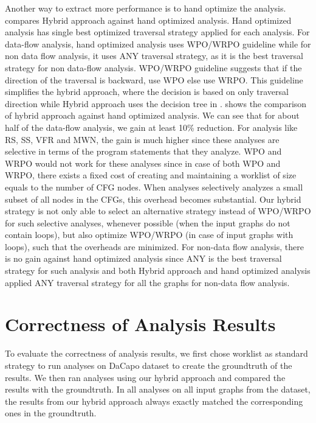 Another way to extract more performance is to hand optimize the analysis.
 compares Hybrid approach against hand optimized analysis. Hand optimized analysis has single best optimized traversal strategy applied for each analysis. For data-flow analysis, hand optimized analysis uses WPO/WRPO guideline while for non data flow analysis, it uses ANY traversal strategy, as it is the best traversal strategy for non data-flow analysis. WPO/WRPO guideline suggests that if the direction of the traversal is backward, use WPO else use WRPO. This guideline  
simplifies the hybrid approach, where the decision is based on only traversal 
direction while Hybrid approach uses the decision tree in . 
 shows the 
comparison of hybrid approach against hand optimized analysis. We can see that for 
about half of the data-flow analysis, we gain at least 10\% reduction. For analysis like 
RS, SS, VFR and MWN, the gain is much higher since these analyses are 
selective in terms of the program statements that they analyze. WPO and WRPO 
would not work for these analyses since in case of both WPO and WRPO, there 
exists a fixed cost of creating and maintaining a worklist of size equals to 
the number of CFG nodes. When analyses selectively analyzes a small subset of 
all nodes in the CFGs, this overhead becomes substantial. Our hybrid strategy 
is not only able to select an alternative strategy instead of WPO/WRPO for 
such selective analyses, whenever possible (when the input graphs do not 
contain loops), but also optimize WPO/WRPO (in case of input graphs with loops), 
such that the overheads are minimized.
For non-data flow analysis, there is no gain against hand optimized analysis since ANY is the best traversal strategy for such analysis and both Hybrid approach and hand optimized analysis applied ANY traversal strategy for all the graphs for non-data flow analysis.
\section{Correctness of Analysis Results}
\label{sec:soundness}

To evaluate the correctness of analysis results, we first chose worklist 
as standard strategy to run analyses on DaCapo dataset to create the 
groundtruth of the results. We then ran analyses using our hybrid approach 
and compared the results with the groundtruth. In all analyses on all 
input graphs from the dataset, the results from our hybrid approach always 
exactly matched the corresponding ones in the groundtruth. 

